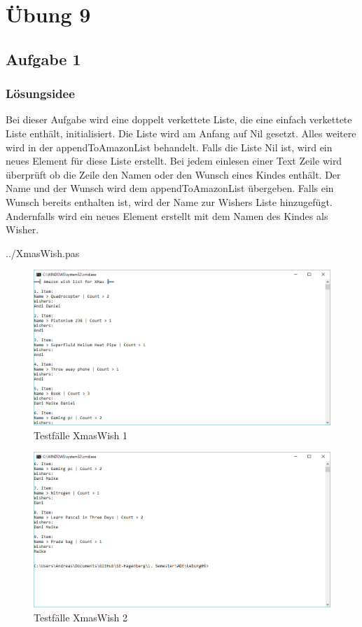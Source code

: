 \section*{Übung 9}
\subsection*{Aufgabe 1}
\subsubsection*{Lösungsidee}
Bei dieser Aufgabe wird eine doppelt verkettete Liste, die eine einfach verkettete Liste enthält, initialisiert. Die Liste wird am Anfang auf Nil gesetzt. Alles weitere wird in der appendToAmazonList behandelt. Falls die Liste Nil ist, wird ein neues Element für diese Liste erstellt. Bei jedem einlesen einer Text Zeile wird überprüft ob die Zeile den Namen oder den Wunsch eines Kindes enthält. Der Name und der Wunsch wird dem appendToAmazonList übergeben. Falls ein Wunsch bereits enthalten ist, wird der Name zur Wishers Liste hinzugefügt. Andernfalls wird ein neues Element erstellt mit dem Namen des Kindes als Wisher. 
\newline

 {../XmasWish.pas}
\begin{figure}[H]
	\centering
	\includegraphics[scale=0.65]{./pictures/XmasWish.png}
	\caption{Testfälle XmasWish 1}
	\label{fig: XmasWish1}
\end{figure}

\begin{figure}[H]
	\centering
	\includegraphics[scale=0.65]{./pictures/XmasWish_2.png}
	\caption{Testfälle XmasWish 2}
	\label{fig: XmasWish2}
\end{figure}

